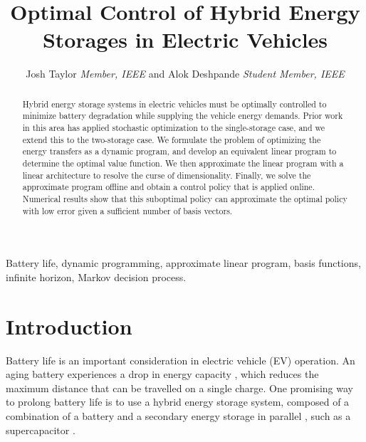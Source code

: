 \documentclass[conference]{IEEEtran}
\begin{document}
\title{Optimal Control of Hybrid Energy Storages in Electric Vehicles}

\author{Josh Taylor \textit{Member, IEEE} and Alok Deshpande \textit{Student Member, IEEE} %
}


\maketitle

\begin{abstract}
Hybrid energy storage systems in electric vehicles must be optimally controlled to minimize battery degradation while supplying the vehicle energy demands. Prior work in this area has applied stochastic optimization to the single-storage case, and we extend this to the two-storage case. We formulate the problem of optimizing the energy transfers as a dynamic program, and develop an equivalent linear program to determine the optimal value function. We then approximate the linear program with a linear architecture to resolve the curse of dimensionality. Finally, we solve the approximate program offline and obtain a control policy that is applied online. Numerical results show that this suboptimal policy can approximate the optimal policy with low error given a sufficient number of basis vectors.
\end{abstract}
\begin{IEEEkeywords}
Battery life, dynamic programming, approximate linear program, basis functions, infinite horizon, Markov decision process.
\end{IEEEkeywords}

\section{Introduction}
Battery life is an important consideration in electric vehicle (EV) operation. An aging battery experiences a drop in energy capacity \cite{8449100}, which reduces the maximum distance that can be travelled on a single charge. One promising way to prolong battery life is to use a hybrid energy storage system, composed of a combination of a battery and a secondary energy storage in parallel \cite{thounthong2009energy}, such as a supercapacitor \cite{bambang2014energy,thounthong2009energy,7939849}. 
\end{document}
